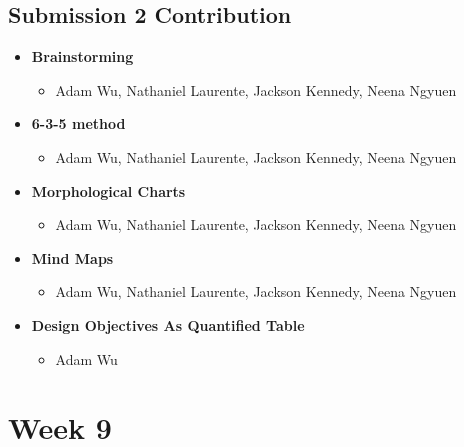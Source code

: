 \subsection{Submission 2 Contribution}
\begin{itemize}
    \item \textbf{Brainstorming}
    \begin{itemize}
        \item Adam Wu, Nathaniel Laurente, Jackson Kennedy, Neena Ngyuen
    \end{itemize}
    
    \item \textbf{6-3-5 method}
    \begin{itemize}
        \item Adam Wu, Nathaniel Laurente, Jackson Kennedy, Neena Ngyuen
    \end{itemize}
    
    \item \textbf{Morphological Charts}
    \begin{itemize}
        \item Adam Wu, Nathaniel Laurente, Jackson Kennedy, Neena Ngyuen
    \end{itemize}
    
    \item \textbf{Mind Maps}
    \begin{itemize}
        \item Adam Wu, Nathaniel Laurente, Jackson Kennedy, Neena Ngyuen
    \end{itemize}
        
    \item \textbf{Design Objectives As Quantified Table}
    \begin{itemize}
        \item Adam Wu
    \end{itemize}
\end{itemize}


\section{Week 9}
